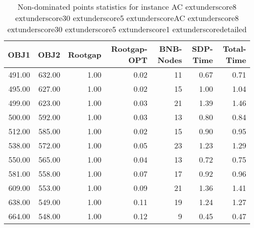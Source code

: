 \begin{table}
\caption{Non-dominated points statistics for instance AC	extunderscore8	extunderscore30	extunderscore5	extunderscoreAC	extunderscore8	extunderscore30	extunderscore5	extunderscore1	extunderscoredetailed}
\label{tab:stats/AC_8_30_5_AC_8_30_5_1_detailed}
\begin{tabular}{rrrrrrr}
\toprule
OBJ1 & OBJ2 & Rootgap & Rootgap-OPT & BNB-Nodes & SDP-Time & Total-Time \\
\midrule
491.00 & 632.00 & 1.00 & 0.02 & 11 & 0.67 & 0.71 \\
495.00 & 627.00 & 1.00 & 0.02 & 15 & 1.00 & 1.04 \\
499.00 & 623.00 & 1.00 & 0.03 & 21 & 1.39 & 1.46 \\
500.00 & 592.00 & 1.00 & 0.03 & 13 & 0.80 & 0.84 \\
512.00 & 585.00 & 1.00 & 0.02 & 15 & 0.90 & 0.95 \\
538.00 & 572.00 & 1.00 & 0.05 & 23 & 1.23 & 1.29 \\
550.00 & 565.00 & 1.00 & 0.04 & 13 & 0.72 & 0.75 \\
581.00 & 558.00 & 1.00 & 0.07 & 17 & 0.92 & 0.96 \\
609.00 & 553.00 & 1.00 & 0.09 & 21 & 1.36 & 1.41 \\
638.00 & 549.00 & 1.00 & 0.11 & 19 & 1.24 & 1.27 \\
664.00 & 548.00 & 1.00 & 0.12 & 9 & 0.45 & 0.47 \\
\bottomrule
\end{tabular}
\end{table}
